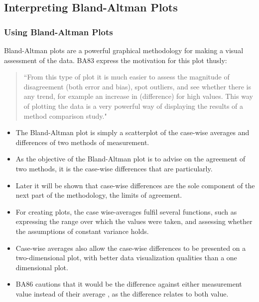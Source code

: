 \documentclass[compress]{beamer}        %
\begin{document}
\subsection{Interpreting Bland-Altman Plots}
\begin{frame}
\frametitle{Using Bland-Altman Plots}
Bland-Altman plots are a powerful graphical methodology for making
a visual assessment of the data. \alert{BA83} express the
motivation for this plot thusly:
\begin{quote}
``From this type of plot it is much easier to assess the magnitude
of disagreement (both error and bias), spot outliers, and see
whether there is any trend, for example an increase in
(difference) for high values. This way of plotting the data is a
very powerful way of displaying the results of a method comparison
study."
\end{quote}
\end{frame}
\begin{frame}
\begin{itemize}
\item The Bland-Altman plot is simply a scatterplot of the case-wise
averages and differences of two methods of measurement. 
\item As the
objective of the Bland-Altman plot is to advise on the agreement
of two methods, it is the case-wise differences that are
particularly. 
\item Later it will be shown that case-wise differences
are the sole component of the next part of the methodology, the
limits of agreement.
\end{itemize}

\end{frame}
\begin{frame}

\begin{itemize}
\item For creating plots, the case wise-averages fulfil several
functions, such as expressing the range over which the values were
taken, and assessing whether the assumptions of constant variance
holds.
\item Case-wise averages also allow the case-wise differences to
be presented on a two-dimensional plot, with better data
visualization qualities than a one dimensional plot.
\item \alert{BA86}
cautions that it would be the difference against either
measurement value instead of their average , as the difference
relates to both value.
\end{itemize}
\end{frame}
\end{document}
